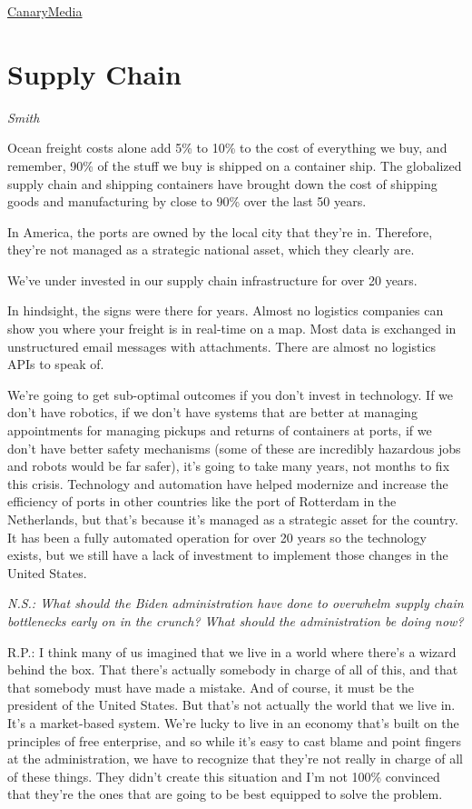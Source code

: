 \documentclass[
]{book}
\begin{document}
\href{https://www.canarymedia.com/articles/joe-bidens-green-new-steel/}{CanaryMedia}

\hypertarget{supply-chain}{%
\chapter{Supply Chain}\label{supply-chain}}

\emph{Smith}

Ocean freight costs alone add 5\% to 10\% to the cost of everything we buy, and remember, 90\% of the stuff we buy is shipped on a container ship. The globalized supply chain and shipping containers have brought down the cost of shipping goods and manufacturing by close to 90\% over the last 50 years.

In America, the ports are owned by the local city that they're in. Therefore, they're not managed as a strategic national asset, which they clearly are.

We've under invested in our supply chain infrastructure for over 20 years.

In hindsight, the signs were there for years. Almost no logistics companies can show you where your freight is in real-time on a map. Most data is exchanged in unstructured email messages with attachments. There are almost no logistics APIs to speak of.

We're going to get sub-optimal outcomes if you don't invest in technology. If we don't have robotics, if we don't have systems that are better at managing appointments for managing pickups and returns of containers at ports, if we don't have better safety mechanisms (some of these are incredibly hazardous jobs and robots would be far safer), it's going to take many years, not months to fix this crisis. Technology and automation have helped modernize and increase the efficiency of ports in other countries like the port of Rotterdam in the Netherlands, but that's because it's managed as a strategic asset for the country. It has been a fully automated operation for over 20 years so the technology exists, but we still have a lack of investment to implement those changes in the United States.

\emph{N.S.: What should the Biden administration have done to overwhelm supply chain bottlenecks early on in the crunch? What should the administration be doing now?}

R.P.: I think many of us imagined that we live in a world where there's a wizard behind the box. That there's actually somebody in charge of all of this, and that that somebody must have made a mistake. And of course, it must be the president of the United States. But that's not actually the world that we live in. It's a market-based system. We're lucky to live in an economy that's built on the principles of free enterprise, and so while it's easy to cast blame and point fingers at the administration, we have to recognize that they're not really in charge of all of these things. They didn't create this situation and I'm not 100\% convinced that they're the ones that are going to be best equipped to solve the problem.
\end{document}
